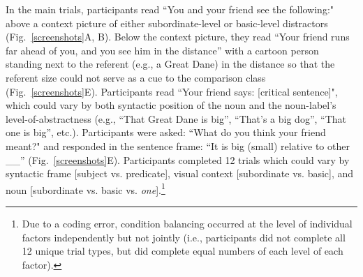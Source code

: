 \documentclass[a4paper,man,natbib]{apa6}
\newcommand{\pt}[1]{\textcolor{Purple}{[pt: #1]}}
\begin{document}
In the main trials, participants read ``You and your friend see the following:" above a context picture of either subordinate-level or basic-level distractors (Fig.~\ref{screenshots}A, B). 
Below the context picture, they read ``Your friend runs far ahead of you, and you see him in the distance'' with a cartoon person standing next to the referent (e.g., a Great Dane) in the distance so that the referent size could not serve as a cue to the comparison class (Fig.~\ref{screenshots}E). 
Participants read ``Your friend says: [critical sentence]", which could vary by both syntactic position of the noun and the noun-label's level-of-abstractness (e.g., ``That Great Dane is big'', ``That's a big dog'', ``That one is big'', etc.). 
Participants were asked: ``What do you think your friend meant?" and responded in the sentence frame: ``It is big (small) relative to other \_\_” (Fig.~\ref{screenshots}E).
Participants completed 12 trials which could vary by syntactic frame [subject vs. predicate], visual context [subordinate vs. basic], and noun [subordinate vs. basic vs. \emph{one}].\footnote{Due to a coding error, condition balancing occurred at the level of individual factors independently but not jointly (i.e., participants did not complete all 12 unique trial types, but did complete equal numbers of each level of each factor).}

\end{document}
